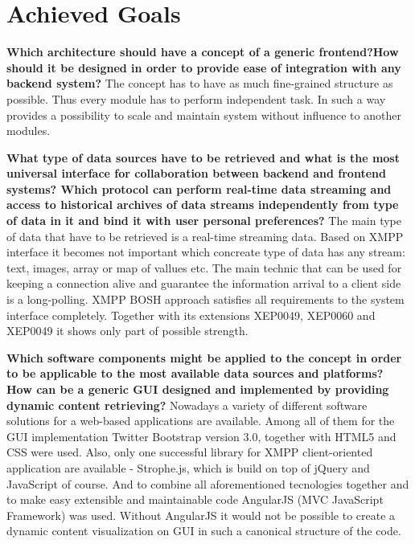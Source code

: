 \section{Achieved Goals}
	   \textbf{Which architecture should have a concept of a generic frontend?How should it be designed in order to provide ease of integration with any backend system?}
	   \newline
	   The concept has to have as much fine-grained structure as possible. Thus every module has to perform independent task. In such a way provides a possibility to scale and maintain system without influence to another modules. 

       \textbf{What type of data sources have to be retrieved and what is the most universal interface for collaboration between backend and frontend systems? Which protocol can perform real-time data streaming and access to historical archives of data streams independently from type of data in it and bind it with user personal preferences?}
       \newline
       The main type of data that have to be retrieved is a real-time streaming data. Based on XMPP interface it becomes not important which concreate type of data has any stream: text, images, array or map of vallues etc. The main technic that can be used for keeping a connection alive and guarantee the information arrival to a client side is a long-polling. 
       \newline
       XMPP BOSH approach satisfies all requirements to the system interface completely. Together with its extensions XEP0049, XEP0060 and XEP0049 it shows only part of possible strength.

       \textbf{Which software components might be applied to the concept in order to be applicable to the most available data sources and platforms? How can be a generic GUI designed and implemented by providing dynamic content retrieving?} 
       \newline
       Nowadays a variety of different software solutions for a web-based applications are available. Among all of them for the GUI implementation Twitter Bootstrap version 3.0, together with HTML5 and CSS were used. Also, only one successful library for XMPP client-oriented application are available - Strophe.js, which is build on top of jQuery and JavaScript of course. And to combine all aforementioned tecnologies together and to make  easy extensible and maintainable code AngularJS (MVC JavaScript Framework) was used. Without AngularJS it would not be possible to create a dynamic content visualization on GUI in such a canonical structure of the code.

